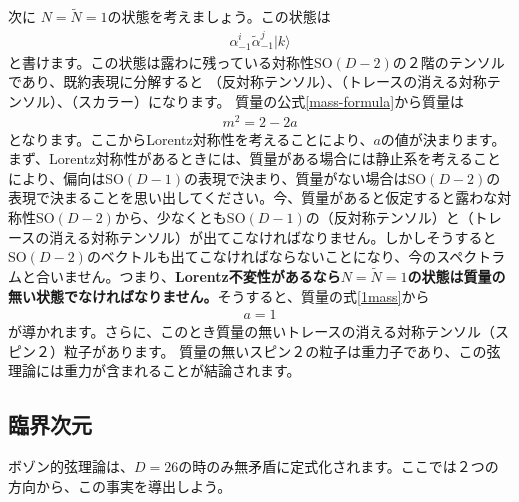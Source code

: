 \documentclass[report,paper=a4, fontsize=12pt, line_length=16cm, number_of_lines=34,dvipdfmx]{jlreq}
\numberwithin{equation}{chapter}
\numberwithin{equation}{section}
\newcommand{\kyou}[1]{{\sffamily \bfseries #1}}
\newcommand{\alphat}{\tilde{\alpha}}
\newcommand{\Nt}{\widetilde{N}}
\begin{document}
次に $N=\Nt=1$の状態を考えましょう。この状態は
\begin{align}
\alpha^i_{-1}\alphat^{j}_{-1}|k\rangle
\end{align}
と書けます。この状態は露わに残っている対称性SO$(D-2)$の２階のテンソルであり、既約表現に分解すると
（反対称テンソル）、（トレースの消える対称テンソル）、（スカラー）になります。
質量の公式\eqref{mass-formula}から質量は
\begin{align}
m^2=2-2a\label{1mass}
\end{align}
となります。ここからLorentz対称性を考えることにより、$a$の値が決まります。まず、Lorentz対称性があるときには、質量がある場合には静止系を考えることにより、偏向はSO$(D-1)$の表現で決まり、質量がない場合はSO$(D-2)$の表現で決まることを思い出してください。今、質量があると仮定すると露わな対称性SO$(D-2)$から、少なくともSO$(D-1)$の（反対称テンソル）と（トレースの消える対称テンソル）が出てこなければなりません。しかしそうするとSO$(D-2)$のベクトルも出てこなければならないことになり、今のスペクトラムと合いません。つまり、\kyou{Lorentz不変性があるなら$N=\Nt=1$の状態は質量の無い状態でなければなりません。}そうすると、質量の式\eqref{1mass}から
\begin{align}
a=1
\end{align}
が導かれます。さらに、このとき質量の無いトレースの消える対称テンソル（スピン２）粒子があります。
質量の無いスピン２の粒子は重力子であり、この弦理論には重力が含まれることが結論されます。

\subsection{臨界次元}
ボゾン的弦理論は、$D=26$の時のみ無矛盾に定式化されます。ここでは２つの方向から、この事実を導出しよう。
\end{document}
